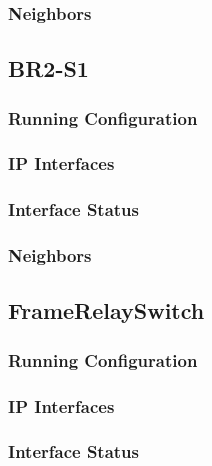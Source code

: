 \subsubsection{Neighbors}


\subsection{BR2-S1}
\subsubsection{Running Configuration}


\subsubsection{IP Interfaces}


\subsubsection{Interface Status}


\subsubsection{Neighbors}


\subsection{FrameRelaySwitch}
\subsubsection{Running Configuration}


\subsubsection{IP Interfaces}


\subsubsection{Interface Status}


